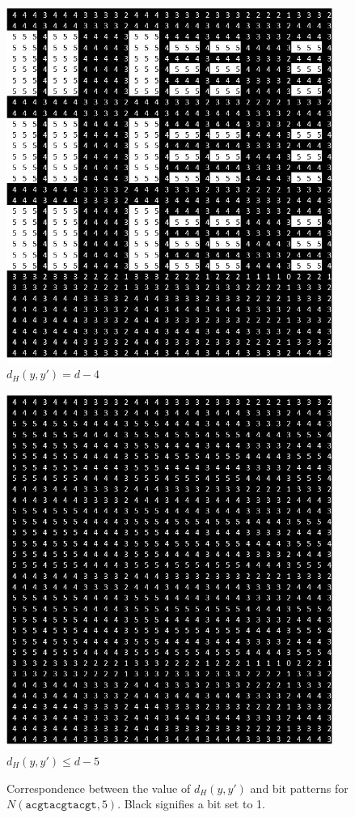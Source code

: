 \documentclass[oneside,12pt]{DISCSthesis}
\begin{document}
\begin{figure}[h]
			\begin{minipage}{.33\textwidth}\centering\includegraphics[width=0.95\textwidth]{img/4}\\ $d_H(y,y') = d-4$ \end{minipage}
			\begin{minipage}{.33\textwidth}\centering\includegraphics[width=0.95\textwidth]{img/5}\\ $d_H(y,y')\leq d-5$ \end{minipage}
			\newline\newline
			\caption{Correspondence between the value of $d_H(y,y')$ and bit patterns for $N(\texttt{acgtacgtacgt}, 5)$. 
			Black signifies a bit set to 1.}
			\end{figure}
\end{document}
